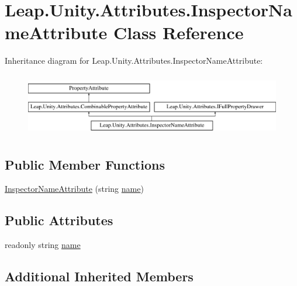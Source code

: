 \hypertarget{class_leap_1_1_unity_1_1_attributes_1_1_inspector_name_attribute}{}\section{Leap.\+Unity.\+Attributes.\+Inspector\+Name\+Attribute Class Reference}
\label{class_leap_1_1_unity_1_1_attributes_1_1_inspector_name_attribute}
Inheritance diagram for Leap.\+Unity.\+Attributes.\+Inspector\+Name\+Attribute\+:\begin{figure}[H]
\begin{center}
\leavevmode
\includegraphics[height=2.772277cm]{class_leap_1_1_unity_1_1_attributes_1_1_inspector_name_attribute}
\end{center}
\end{figure}
\subsection*{Public Member Functions}
\begin{DoxyCompactItemize}
\item 
\mbox{\hyperlink{class_leap_1_1_unity_1_1_attributes_1_1_inspector_name_attribute_a51744790c86e1b49a8720bc479722041}{Inspector\+Name\+Attribute}} (string \mbox{\hyperlink{class_leap_1_1_unity_1_1_attributes_1_1_inspector_name_attribute_a5ccb64c89a010dc23c07a4c5406b6d06}{name}})
\end{DoxyCompactItemize}
\subsection*{Public Attributes}
\begin{DoxyCompactItemize}
\item 
readonly string \mbox{\hyperlink{class_leap_1_1_unity_1_1_attributes_1_1_inspector_name_attribute_a5ccb64c89a010dc23c07a4c5406b6d06}{name}}
\end{DoxyCompactItemize}
\subsection*{Additional Inherited Members}


